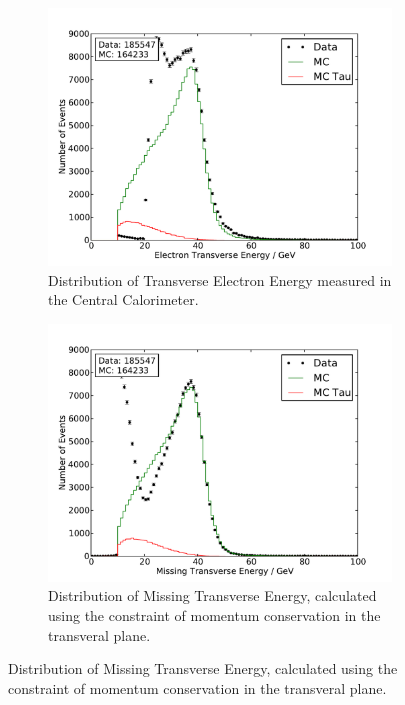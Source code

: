 \documentclass[
	paper=A4,
	parskip=full,
	chapterprefix=true,
	11pt,
	headings=normal,
	bibliography=totoc,
	listof=totoc,
	titlepage=on,
]{scrreprt}
\begin{document}
\begin{figure}%
	\centering
	\begin{subfigure}{0.45\textwidth}
		\includegraphics{nocuts/E_T_el}
		\caption{Distribution of Transverse Electron Energy measured in the Central Calorimeter.}
	\end{subfigure}
	\begin{subfigure}{0.45\textwidth}
		\includegraphics{nocuts/E_T_miss}
		\caption{Distribution of Missing Transverse Energy, calculated using the constraint of momentum conservation in the transveral plane.}
	\end{subfigure}
	\label{no_cuts_Ets}
\end{figure}
\end{document}
